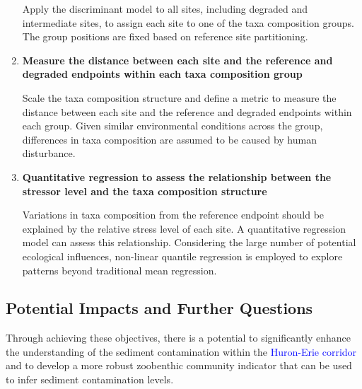 \begin{enumerate}
    Apply the discriminant model to all sites, including degraded and intermediate sites, 
    to assign each site to one of the taxa composition groups. 
    The group positions are fixed based on reference site partitioning.

    \item \textbf{Measure the distance between each site and the reference and degraded endpoints within each taxa composition group}

    Scale the taxa composition structure and define a metric to measure the 
    distance between each site and the reference and degraded endpoints within each group.
    Given similar environmental conditions across the group, differences in taxa composition are assumed to be caused by human disturbance.

    \item \textbf{Quantitative regression to assess the relationship between the stressor level and the taxa composition structure}
    
    Variations in taxa composition from the reference endpoint should be explained by the 
    relative stress level of each site. A quantitative regression model can assess this relationship.
    Considering the large number of potential ecological influences, non-linear quantile regression is employed 
    to explore patterns beyond traditional mean regression.

\end{enumerate}

\subsection{Potential Impacts and Further Questions}

Through achieving these objectives, there is a potential to significantly enhance the understanding of
the sediment contamination within the \textcolor{blue}{Huron-Erie corridor} and to develop 
a more robust zoobenthic community indicator that can be used to infer sediment contamination levels.

